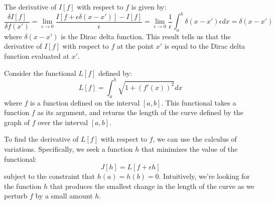 \begin{subappendices}
The derivative of $I[f]$ with respect to $f$ is given by:
$$\frac{\delta I[f]}{\delta f(x')} = \lim_{\epsilon\rightarrow 0} \frac{I[f+\epsilon \delta(x-x')] - I[f]}{\epsilon} = \lim_{\epsilon\rightarrow 0} \frac{1}{\epsilon}\int_a^b \delta(x-x')\epsilon dx = \delta(x-x')$$
where $\delta(x-x')$ is the Dirac delta function. This result tells us that the derivative of $I[f]$ with respect to $f$ at the point $x'$ is equal to the Dirac delta function evaluated at $x'$.




Consider the functional $L[f]$ defined by:
$$L[f] = \int_a^b \sqrt{1+(f'(x))^2}dx$$
where $f$ is a function defined on the interval $[a,b]$. This functional takes a function $f$ as its argument, and returns the length of the curve defined by the graph of $f$ over the interval $[a,b]$.

To find the derivative of $L[f]$ with respect to $f$, we can use the calculus of variations. Specifically, we seek a function $h$ that minimizes the value of the functional:
$$J[h] = L[f+\epsilon h]$$
subject to the constraint that $h(a) = h(b) = 0$. Intuitively, we're looking for the function $h$ that produces the smallest change in the length of the curve as we perturb $f$ by a small amount $h$.
%
%
%
%


\end{subappendices}
